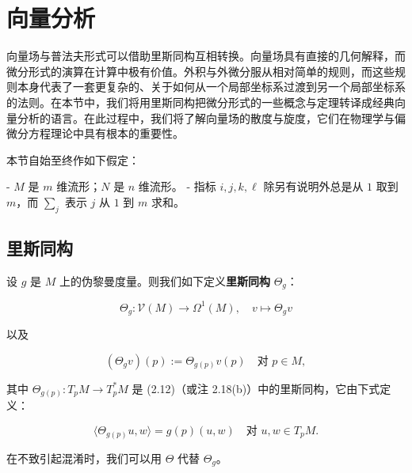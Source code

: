 \section{向量分析}

向量场与普法夫形式可以借助里斯同构互相转换。向量场具有直接的几何解释，而微分形式的演算在计算中极有价值。外积与外微分服从相对简单的规则，而这些规则本身代表了一套更复杂的、关于如何从一个局部坐标系过渡到另一个局部坐标系的法则。在本节中，我们将用里斯同构把微分形式的一些概念与定理转译成经典向量分析的语言。在此过程中，我们将了解向量场的散度与旋度，它们在物理学与偏微分方程理论中具有根本的重要性。

本节自始至终作如下假定：

- $ M $ 是 $ m $ 维流形；$ N $ 是 $ n $ 维流形。
- 指标 $ i, j, k, \ell $ 除另有说明外总是从 $ 1 $ 取到 $ m $，而 $ \sum_{j} $ 表示 $ j $ 从 $ 1 $ 到 $ m $ 求和。

\subsection*{里斯同构}

设 $ g $ 是 $ M $ 上的伪黎曼度量。则我们如下定义\textbf{里斯同构} $ \Theta_{g} $：

\begin{equation}
\Theta_{g}: \mathcal{V}(M) \to \Omega^{1}(M), \quad v \mapsto \Theta_{g}v\tag{6.1}
\end{equation}

以及

\[
(\Theta_{g}v)(p) := \Theta_{g(p)}v(p) \quad \text{对 } p \in M,
\]

其中 $ \Theta_{g(p)}: T_{p}M \to T_{p}^{*}M $ 是 (2.12)（或注 2.18(b)）中的里斯同构，它由下式定义：

\[
\langle \Theta_{g(p)}u, w \rangle = g(p)(u, w) \quad \text{对 } u, w \in T_{p}M.
\]

在不致引起混淆时，我们可以用 $ \Theta $ 代替 $ \Theta_{g} $。

